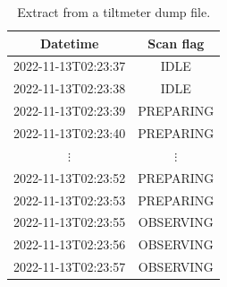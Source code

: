 \begin{table}[H]
    \centering
    \caption{Extract from a tiltmeter dump file.}
    \begin{tabular}{cc}
        \toprule
        Datetime & Scan flag \\
        \midrule
        2022-11-13T02:23:37 & IDLE \\
        2022-11-13T02:23:38 & IDLE \\
        2022-11-13T02:23:39 & PREPARING \\
        2022-11-13T02:23:40 & PREPARING \\
        $\vdots$ & $\vdots$ \\ 
        2022-11-13T02:23:52 & PREPARING \\
        2022-11-13T02:23:53 & PREPARING \\
        2022-11-13T02:23:55 & OBSERVING \\
        2022-11-13T02:23:56 & OBSERVING \\
        2022-11-13T02:23:57 & OBSERVING \\
        \bottomrule
    \end{tabular}
    \label{tab:tiltmeter_example}
\end{table}